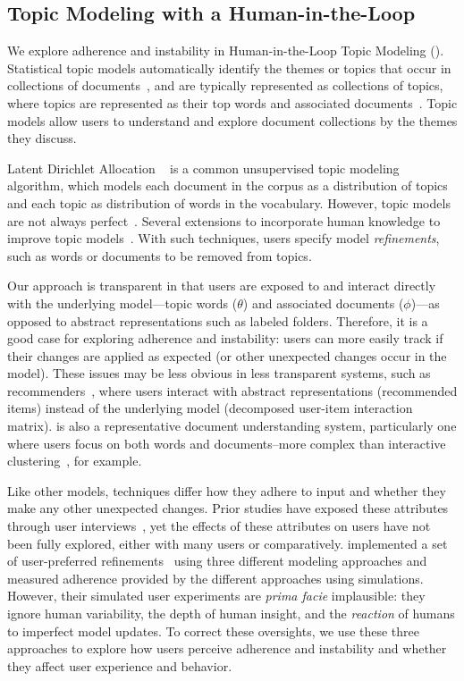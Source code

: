 \subsection{Topic Modeling with a Human-in-the-Loop}
We explore adherence and instability in Human-in-the-Loop Topic Modeling (\hltm{}). Statistical topic models automatically identify the themes or topics that occur in collections of documents~\cite{boyd-graber-17}, and are typically represented as collections of topics, where topics are represented as their top words and associated documents~\cite{Chaney2012VisualizingModels}. Topic models allow users to understand and explore document collections by the themes they discuss.

Latent Dirichlet Allocation ~\citep[\lda{}]{blei-03} is a common
unsupervised topic modeling algorithm, which models each document in
the corpus as a distribution of topics and each topic as distribution
of words in the vocabulary.  However, topic models are not always
perfect~\cite{boyd-graber-14}.  Several extensions to \lda{} incorporate
human knowledge to improve topic
models~\cite[\hltm{}]{Yang2015User-directedContent, hu-14,
  Hoque2015ConVisIT:Conversations, xie2015incorporating, petterson2010word,
  pleple-13, wang2019interactive}. With such techniques,
users specify model \textit{refinements}, such as words or documents
to be removed from topics.


Our \hltm{} approach is transparent in that users are exposed to and interact directly with the underlying model---topic words ($\theta$) and associated documents ($\phi$)---as opposed to abstract representations such as labeled folders. Therefore, it is a good case for exploring adherence and instability: 
users can more easily track if their changes are applied as expected (or other unexpected changes occur in the model). These issues may be less obvious in less transparent systems, such as recommenders~\cite{Herlocker2004EvaluatingSystems}, where users interact with abstract representations (recommended items) instead of the underlying model (decomposed user-item interaction matrix). \hltm{} is also a representative document understanding system, particularly one where users focus on both words and documents--more complex than interactive clustering~\cite{Cohn2008Semi-supervisedFeedback}, for example. 


Like other  models, \hltm{} techniques
differ how they adhere to input and whether they make any other unexpected changes. Prior studies have exposed these attributes through user interviews~\cite{Smith2018ClosingSystem,Lee2017TheModels}, yet the effects of these attributes on users have
not been fully explored, either with many users or comparatively.
 implemented a set of
user-preferred refinements~\cite{Lee2017TheModels} using three different modeling approaches and measured adherence provided by the different approaches using simulations.
However, their simulated user experiments are \textit{prima facie} implausible: they ignore human variability, the depth of human insight, and the \emph{reaction} of humans to imperfect model updates.
To correct these oversights, we use these three approaches to explore
how users perceive adherence and instability and whether they affect
user experience and behavior.

